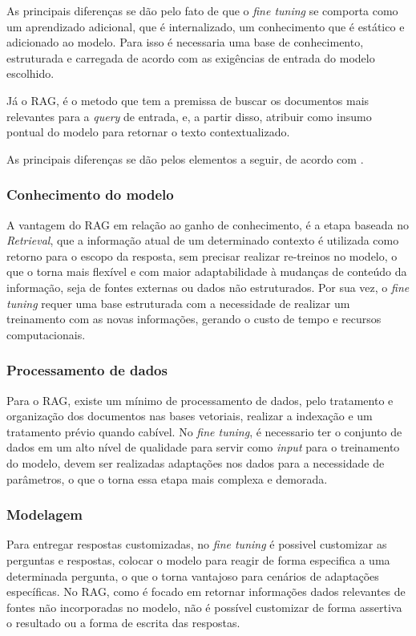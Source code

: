 As principais diferenças se dão pelo fato de que o \textit{fine tuning} se comporta como um aprendizado adicional, que é internalizado, um conhecimento que é estático e adicionado ao modelo. Para isso é necessaria uma base de conhecimento, estruturada e carregada de acordo com as exigências de entrada do modelo escolhido. 

Já o RAG, é o metodo que tem a premissa de buscar os documentos mais relevantes para a \textit{query} de entrada, e, a partir disso, atribuir como insumo pontual do modelo para retornar o texto contextualizado.

As principais diferenças se dão pelos elementos a seguir, de acordo com \cite{gao2024retrievalaugmentedgenerationlargelanguage}.

\subsubsection{Conhecimento do modelo}
\label{knowledge}
A vantagem do RAG em relação ao ganho de conhecimento, é a etapa baseada no \textit{Retrieval}, que a informação atual de um determinado contexto é utilizada como retorno para o escopo da resposta, sem precisar realizar re-treinos no modelo, o que o torna mais flexível e com maior adaptabilidade à mudanças de conteúdo da informação, seja de fontes externas ou dados não estruturados. Por sua vez, o \textit{fine tuning} requer uma base estruturada com a necessidade de realizar um treinamento com as novas informações, gerando o custo de tempo e recursos computacionais.

\subsubsection{Processamento de dados}
\label{dataprocess}
Para o RAG, existe um mínimo de processamento de dados, pelo tratamento e organização dos documentos nas bases vetoriais, realizar a indexação e um tratamento prévio quando cabível. No \textit{fine tuning}, é necessario ter o conjunto de dados em um alto nível de qualidade para servir como \textit{input} para o treinamento do modelo, devem ser realizadas adaptações nos dados para a necessidade de parâmetros, o que o torna essa etapa mais complexa e demorada. 

\subsubsection{Modelagem}
\label{modeling}
Para entregar respostas customizadas, no \textit{fine tuning} é possivel customizar as perguntas e respostas, colocar o modelo para reagir de forma especifica a uma determinada pergunta, o que o torna vantajoso para cenários de adaptações específicas. No RAG, como é focado em retornar informações dados relevantes de fontes não incorporadas no modelo, não é possível customizar de forma assertiva o resultado ou a forma de escrita das respostas.

